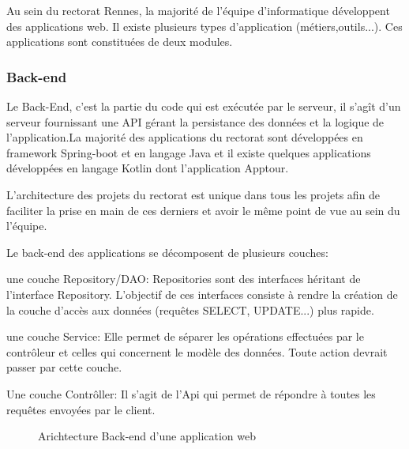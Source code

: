 \documentclass[a4paper]{article}
\begin{document}
Au sein du rectorat Rennes, la majorité de l'équipe d'informatique  développent des applications web. Il existe plusieurs types d'application (métiers,outils...). Ces applications sont constituées de deux modules. 

\subsubsection{Back-end}

Le Back-End, c’est la partie du code qui est exécutée par le serveur, il s’agît d'un serveur fournissant une API gérant la persistance des données et la logique de l'application.La majorité des applications du rectorat sont développées en framework Spring-boot et en langage Java et il existe quelques applications développées en langage Kotlin dont l'application Apptour.

L'architecture des projets du rectorat est unique dans tous les projets afin  de faciliter la prise en main de ces derniers et avoir le même point de vue au sein du l'équipe.

Le back-end des applications se décomposent de plusieurs couches: 

une couche Repository/DAO: Repositories sont des interfaces héritant de l'interface Repository. L'objectif de ces interfaces consiste à rendre la création de la couche d'accès aux données (requêtes SELECT, UPDATE...) plus rapide.

une couche Service: Elle permet de séparer les opérations effectuées par le contrôleur et celles qui concernent le modèle des données. Toute action devrait passer par cette couche.

Une couche Contrôller: Il s'agit de l'Api qui permet de répondre à toutes les requêtes envoyées par le client. 

\begin{figure}[H]
	\centering
  		\caption{Arichtecture Back-end d'une application web}
	\end{figure}
\end{document}
